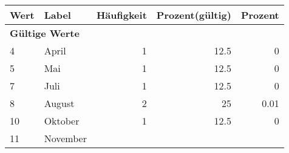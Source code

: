      \begin{longtable}{lXrrr}
     \toprule
     \textbf{Wert} & \textbf{Label} & \textbf{Häufigkeit} & \textbf{Prozent(gültig)} & \textbf{Prozent} \\
     \endhead
     \midrule
     \multicolumn{5}{l}{\textbf{Gültige Werte}}\\

     4 &
     \multicolumn{1}{X}{ April   } &


       \num{1} &
       \num[round-mode=places,round-precision=2]{12.5} &
         \num[round-mode=places,round-precision=2]{0} \\

     5 &
     \multicolumn{1}{X}{ Mai   } &


       \num{1} &
       \num[round-mode=places,round-precision=2]{12.5} &
         \num[round-mode=places,round-precision=2]{0} \\

     7 &
     \multicolumn{1}{X}{ Juli   } &


       \num{1} &
       \num[round-mode=places,round-precision=2]{12.5} &
         \num[round-mode=places,round-precision=2]{0} \\

     8 &
     \multicolumn{1}{X}{ August   } &


       \num{2} &
       \num[round-mode=places,round-precision=2]{25} &
         \num[round-mode=places,round-precision=2]{0.01} \\

     10 &
     \multicolumn{1}{X}{ Oktober   } &


       \num{1} &
       \num[round-mode=places,round-precision=2]{12.5} &
         \num[round-mode=places,round-precision=2]{0} \\

     11 &
     \multicolumn{1}{X}{ November   } &



\end{longtable}
